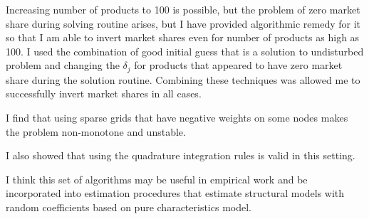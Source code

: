 \documentclass[12pt,letterpaper]{article}
\begin{document}
	Increasing number of products to 100 is possible, but the problem of zero market share during solving routine arises, but I have provided algorithmic remedy for it so that I am able to invert market shares even for number of products as high as 100. I used the combination of good initial guess that is a solution to undisturbed problem and changing the $\delta_j$ for products that appeared to have zero market share during the solution routine. Combining these techniques was allowed me to successfully invert market shares in all cases.
	
	I find that using sparse grids that have negative weights on some nodes makes the problem non-monotone and unstable.
	
	I also showed that using the quadrature integration rules is valid in this setting.
	
	I think this set of algorithms may be useful in empirical work and be incorporated into estimation procedures that estimate structural models with random coefficients based on pure characteristics model.
	
	
\end{document}
